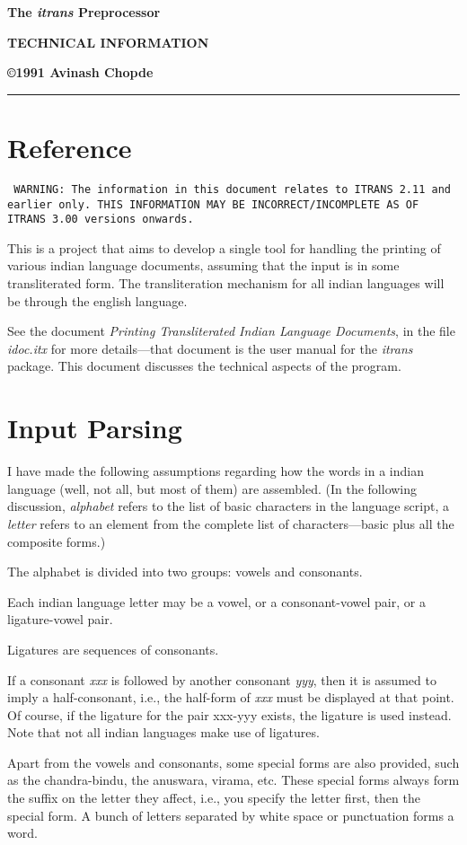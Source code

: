\documentclass[11pt]{article}
\begin{document}
\centerline{\LARGE\bf The {\em itrans} Preprocessor}
\medskip
\centerline{\bf TECHNICAL INFORMATION}
\medskip
\centerline{\bf \copyright 1991 Avinash Chopde}
\medskip
\hrule
\bigskip

\section{Reference}

{\tt
WARNING: The information in this document relates to ITRANS 2.11 and
earlier only.
THIS INFORMATION MAY BE INCORRECT/INCOMPLETE AS OF ITRANS 3.00 versions
onwards.
}

This is a project that aims to develop a single tool for handling the
printing of various indian language documents, assuming that the input is
in some transliterated form.
The transliteration mechanism for all indian languages will be through
the english language.

See the document {\em Printing Transliterated Indian Language Documents},
in the file {\em idoc.itx} for more details---that document is the
user manual for the {\em itrans} package.
This document discusses the technical aspects of the program.

\section{Input Parsing}

I have made the following assumptions regarding how the words in a
indian language (well, not all, but most of them) are assembled.
(In the following discussion, {\em alphabet} refers to the list of basic
characters in the language script, a
{\em letter} refers to an element from the complete list of characters---basic
plus all the composite forms.)

The alphabet is divided into two groups: vowels and consonants.

Each indian language letter may be a vowel, or a consonant-vowel pair, or a
ligature-vowel pair.

Ligatures are sequences of consonants.

If a consonant {\em xxx} is followed by another consonant {\em yyy}, then it is
assumed to imply a half-consonant, i.e., the half-form of {\em xxx} must be
displayed at that point.
Of course, if the ligature for the pair xxx-yyy exists, the ligature
is used instead.
Note that not all indian languages make use of ligatures.

Apart from the vowels and consonants, some special forms are also
provided, such as the chandra-bindu, the anuswara, virama, etc.
These special forms always form the suffix on the letter they affect,
i.e., you specify the letter first, then the special form.
A bunch of letters separated by white space or punctuation forms a word.
\end{document}
